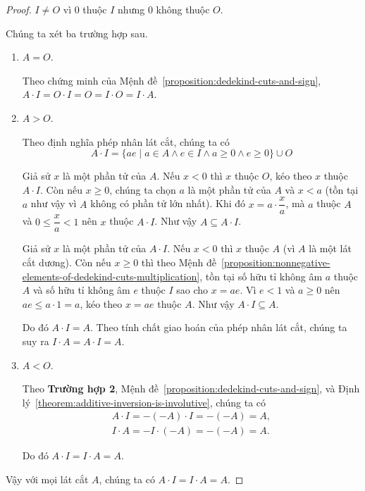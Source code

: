 \begin{proof}
    $I\ne O$ vì $0$ thuộc $I$ nhưng $0$ không thuộc $O$.

    Chúng ta xét ba trường hợp sau.
    \begin{enumerate}[label={\textbf{Trường hợp \arabic*.}},itemindent=2cm]
        \item $A = O$.

              Theo chứng minh của Mệnh đề~\ref{proposition:dedekind-cuts-and-sign}, $A\cdot I = O\cdot I = O = I\cdot O = I\cdot A$.
        \item $A > O$.

              Theo định nghĩa phép nhân lát cắt, chúng ta có
              \[
                  A\cdot I = \{ ae \mid a\in A\wedge e\in I\wedge a\geq 0\wedge e\geq 0 \}\cup O
              \]

              Giả sử $x$ là một phần tử của $A$. Nếu $x < 0$ thì $x$ thuộc $O$, kéo theo $x$ thuộc $A\cdot I$. Còn nếu $x\geq 0$, chúng ta chọn $a$ là một phần tử của $A$ và $x < a$ (tồn tại $a$ như vậy vì $A$ không có phần tử lớn nhất). Khi đó $x = a\cdot\dfrac{x}{a}$, mà $a$ thuộc $A$ và $0\leq \dfrac{x}{a} < 1$ nên $x$ thuộc $A\cdot I$. Như vậy $A\subseteq A\cdot I$.

              Giả sử $x$ là một phần tử của $A\cdot I$. Nếu $x < 0$ thì $x$ thuộc $A$ (vì $A$ là một lát cắt dương). Còn nếu $x\geq 0$ thì theo Mệnh đề~\ref{proposition:nonnegative-elements-of-dedekind-cuts-multiplication}, tồn tại số hữu tỉ không âm $a$ thuộc $A$ và số hữu tỉ không âm $e$ thuộc $I$ sao cho $x = ae$. Vì $e < 1$ và $a\geq 0$ nên $ae\leq a\cdot 1 = a$, kéo theo $x = ae$ thuộc $A$. Như vậy $A\cdot I\subseteq A$.

              Do đó $A\cdot I = A$. Theo tính chất giao hoán của phép nhân lát cắt, chúng ta suy ra $I\cdot A = A\cdot I = A$.
        \item $A < O$.

              Theo \textbf{Trường hợp 2}, Mệnh đề~\ref{proposition:dedekind-cuts-and-sign}, và Định lý~\ref{theorem:additive-inversion-is-involutive}, chúng ta có
              \[
                  \begin{split}
                      A\cdot I = -(-A)\cdot I = -(-A) = A, \\
                      I\cdot A = -I\cdot (-A) = -(-A) = A.
                  \end{split}
              \]

              Do đó $A\cdot I = I\cdot A = A$.
    \end{enumerate}

    Vậy với mọi lát cắt $A$, chúng ta có $A\cdot I = I\cdot A = A$.
\end{proof}


